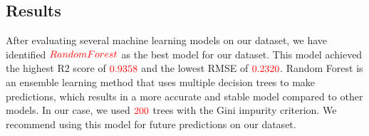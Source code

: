 \vspace{-1cm}
\begin{center}
\section*{Results}    
\end{center}
\vspace{-.25cm}
{\large After evaluating several machine learning models on our dataset, we have identified $\color{red}Random Forest$ as the best model for our dataset. This model achieved the highest R2 score of $\color{red}0.9358$ and the lowest RMSE of $\color{red}0.2320$. Random Forest is an ensemble learning method that uses multiple decision trees to make predictions, which results in a more accurate and stable model compared to other models. In our case, we used $\color{red}200$ trees with the Gini impurity criterion. We recommend using this model for future predictions on our dataset.  }